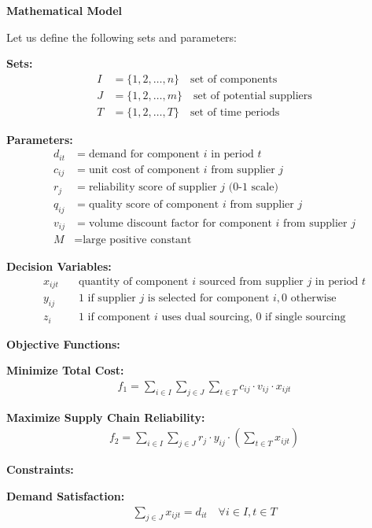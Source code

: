 \documentclass{article}
\begin{document}
\textbf{Mathematical Model}

Let us define the following sets and parameters:

\textbf{Sets:}
\begin{align}
I &= \{1, 2, \ldots, n\} \quad \text{set of components} \\
J &= \{1, 2, \ldots, m\} \quad \text{set of potential suppliers} \\
T &= \{1, 2, \ldots, T\} \quad \text{set of time periods}
\end{align}

\textbf{Parameters:}
\begin{align}
d_{it} &= \text{demand for component } i \text{ in period } t \\
c_{ij} &= \text{unit cost of component } i \text{ from supplier } j \\
r_{j} &= \text{reliability score of supplier } j \text{ (0-1 scale)} \\
q_{ij} &= \text{quality score of component } i \text{ from supplier } j \\
v_{ij} &= \text{volume discount factor for component } i \text{ from supplier } j \\
M &= \text{large positive constant}
\end{align}

\textbf{Decision Variables:}
\begin{align}
x_{ijt} &\quad \text{quantity of component } i \text{ sourced from supplier } j \text{ in period } t \\
y_{ij} &\quad \text{1 if supplier } j \text{ is selected for component } i, \text{0 otherwise} \\
z_{i} &\quad \text{1 if component } i \text{ uses dual sourcing, 0 if single sourcing}
\end{align}

\textbf{Objective Functions:}

\textbf{Minimize Total Cost:}
\begin{align}
f_1 = \sum_{i \in I} \sum_{j \in J} \sum_{t \in T} c_{ij} \cdot v_{ij} \cdot x_{ijt}
\end{align}

\textbf{Maximize Supply Chain Reliability:}
\begin{align}
f_2 = \sum_{i \in I} \sum_{j \in J} r_j \cdot y_{ij} \cdot \left(\sum_{t \in T} x_{ijt}\right)
\end{align}

\textbf{Constraints:}

\textbf{Demand Satisfaction:}
\begin{align}
\sum_{j \in J} x_{ijt} = d_{it} \quad \forall i \in I, t \in T
\end{align}
\end{document}
